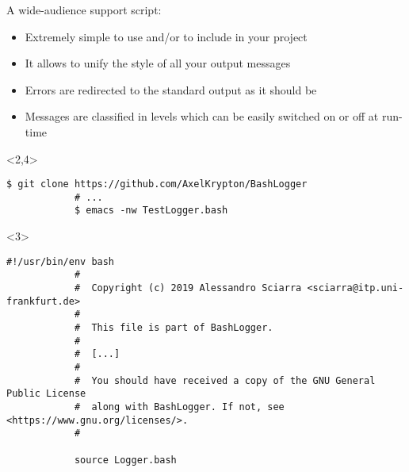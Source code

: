\begin{frame}[fragile]{A wide-audience support script: }
    \vspace{-3mm}
    \begin{itemize}[<only@1-2,4->]
        \item Extremely simple to use and/or to include in your project
        \item It allows to unify the style of all your output messages
        \item Errors are redirected to the standard output as it should be
        \item Messages are classified in levels which can be easily switched on or off at run-time
    \end{itemize}
    \begin{onlyenv}<2,4>
        \begin{lstlisting}[style=myBash, aboveskip=3mm]
            $ git clone https://github.com/AxelKrypton/BashLogger
            # ...
            $ emacs -nw TestLogger.bash
        \end{lstlisting}
    \end{onlyenv}
    \begin{onlyenv}<3>
        \vspace{3mm}
        \begin{lstlisting}[style=myBash, numbers=none, style=smaller]
            #!/usr/bin/env bash
            #
            #  Copyright (c) 2019 Alessandro Sciarra <sciarra@itp.uni-frankfurt.de>
            #
            #  This file is part of BashLogger.
            #
            #  [...]
            #
            #  You should have received a copy of the GNU General Public License
            #  along with BashLogger. If not, see <https://www.gnu.org/licenses/>.
            #
            
            source Logger.bash
            

\end{lstlisting}
\end{onlyenv}
\end{frame}
